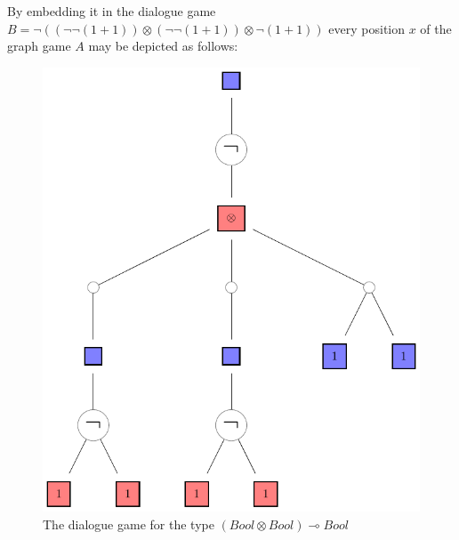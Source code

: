 \documentclass[11pt]{llncs} %
\begin{document}
By embedding it in the dialogue game $B = \neg ( (\neg \neg (1+1)) \otimes (\neg \neg (1+1)) \otimes \neg (1+1))$
every position $x$ of the graph game $A$ may be depicted as follows:
\begin{figure}[H]\centering\includegraphics[scale=0.45]{bool-tens-bool-arrow-bool-dialogue.pdf}\caption{The dialogue game for the type $(Bool \otimes Bool) \multimap Bool$} \end{figure}

  



\end{document}
